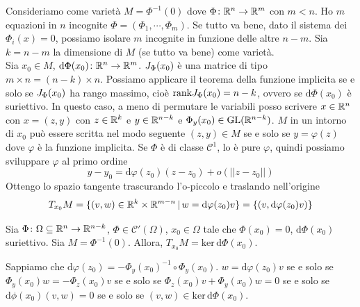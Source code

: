 \documentclass[a4paper]{article}
\begin{document}
\begin{snippetexample}{}
    Consideriamo come varietà \(M = \Phi^{-1}(0)\)
    dove \(\Phi \colon \mathbb{R}^n \to \mathbb{R}^m\)
    con \(m < n\). Ho \(m\) equazioni in \(n\) incognite
    \(\Phi = (\Phi_1, \cdots, \Phi_m)\).
    Se tutto va bene, dato il sistema dei \(\Phi_i(x) = 0\),
    possiamo isolare \(m\) incognite in funzione delle altre \(n-m\).
    Sia \(k = n-m\) la dimensione di \(M\) (se tutto va bene)
    come varietà. \\
    Sia \(x_0 \in M\), \(\text{d}\Phi(x_0) \colon \mathbb{R}^n \to \mathbb{R}^m\).
    \(J_\Phi(x_0)\) è una matrice di tipo \(m\times n = (n-k)\times n\).
    Possiamo applicare il teorema della funzione implicita se e solo se
    \(J_\Phi(x_0)\) ha rango massimo, cioè \(\text{rank} J_\Phi(x_0) = n-k\), ovvero se
    \(\text{d}\Phi(x_0)\) è suriettivo. In questo caso, a meno di permutare le variabili posso scrivere
    \(x\in\mathbb{R}^n\) con \(x=(z,y)\) con \(z\in\mathbb{R}^k\) e \(y\in\mathbb{R}^{n-k}\) e
    \(\Phi_y(x_0) \in \text{GL}(\mathbb{R}^{n-k})\).
    \(M\) in un intorno di \(x_0\) può essere scritta nel modo seguente
    \((z,y) \in M\) se e solo se \(y = \varphi(z)\) dove \(\varphi\) è la funzione implicita.
    Se \(\Phi\) è di classe \(\mathcal{C}^1\), lo è pure \(\varphi\), quindi possiamo sviluppare
    \(\varphi\) al primo ordine
    \[
        y-y_0 = \text{d}\varphi(z_0)(z-z_0) + o(||z-z_0||)
    \]
    Ottengo lo spazio tangente trascurando l'o-piccolo e traslando nell'origine
    \[T_{x_0}M = \{(v,w) \in \mathbb{R}^k \times \mathbb{R}^{m-n} \,|\, w = \text{d}\varphi(z_0) v\}
    = \{(v, \text{d}\varphi(z_0)v)\}\]
\end{snippetexample}

\begin{snippettheorem}{}
    Sia \(\Phi \colon \Omega \subseteq \mathbb{R}^n \to \mathbb{R}^{n-k}\),
    \(\Phi \in \mathcal{C}'(\Omega)\), \(x_0 \in \Omega\) tale che
    \(\Phi(x_0) = 0\), \(\text{d}\Phi(x_0)\) suriettivo.
    Sia \(M = \Phi^{-1}(0)\).
    Allora, \(T_{x_0}M = \text{ker} \,\text{d}\Phi(x_0)\).
\end{snippettheorem}

\begin{snippetproof}{}
    Sappiamo che \(\text{d}\varphi(z_0) = -\Phi_y(x_0)^{-1} \circ \Phi_y(x_0)\).
    \(w = \text{d}\varphi(z_0)v\) se e solo se \(\Phi_y(x_0) w = -\Phi_z(x_0)v\)
    se e solo se \(\Phi_z(x_0)v + \Phi_y(x_0)w = 0\) se e solo se
    \(\text{d}\phi(x_0)(v,w) =0\) se e solo se \((v,w) \in \text{ker} \,\text{d}\Phi(x_0)\). 
\end{snippetproof}
\end{document}
